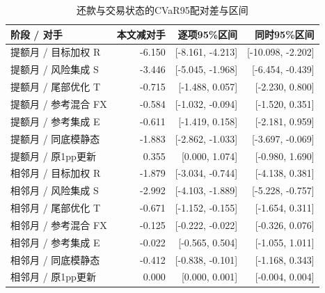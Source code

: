 \begin{table}[H]\centering\caption{还款与交易状态的CVaR95配对差与区间}
\fontsize{9bp}{12bp}\selectfont
\begin{tabularx}{\linewidth}{@{}Yrrr@{}}\toprule
阶段 / 对手 & 本文减对手 & 逐项95\%区间 & 同时95\%区间\\\midrule
提额月 / 目标加权 R & -6.150 & [-8.161, -4.213] & [-10.098, -2.202]\\
提额月 / 风险集成 S & -3.446 & [-5.045, -1.968] & [-6.454, -0.439]\\
提额月 / 尾部优化 T & -0.715 & [-1.488, 0.057] & [-2.230, 0.800]\\
提额月 / 参考混合 FX & -0.584 & [-1.032, -0.094] & [-1.520, 0.351]\\
提额月 / 参考集成 E & -0.611 & [-1.419, 0.158] & [-2.181, 0.959]\\
提额月 / 同底模静态 & -1.883 & [-2.862, -1.033] & [-3.697, -0.069]\\
提额月 / 原1pp更新 & 0.355 & [0.000, 1.074] & [-0.980, 1.690]\\
相邻月 / 目标加权 R & -1.879 & [-3.034, -0.744] & [-4.138, 0.381]\\
相邻月 / 风险集成 S & -2.992 & [-4.103, -1.889] & [-5.228, -0.757]\\
相邻月 / 尾部优化 T & -0.671 & [-1.152, -0.155] & [-1.654, 0.311]\\
相邻月 / 参考混合 FX & -0.125 & [-0.222, -0.022] & [-0.326, 0.076]\\
相邻月 / 参考集成 E & -0.022 & [-0.565, 0.504] & [-1.055, 1.011]\\
相邻月 / 同底模静态 & -0.412 & [-0.838, -0.101] & [-1.168, 0.343]\\
相邻月 / 原1pp更新 & 0.000 & [0.000, 0.001] & [-0.004, 0.004]\\
\bottomrule\end{tabularx}
\end{table}